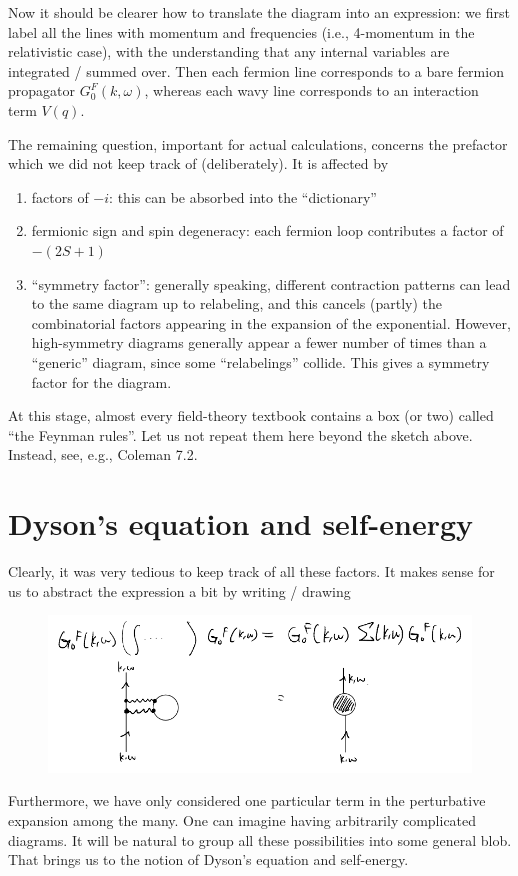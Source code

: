 Now it should be clearer how to translate the diagram into an expression: we first label all the lines with momentum and frequencies (i.e., 4-momentum in the relativistic case), with the understanding that any internal variables are integrated / summed over. Then each fermion line corresponds to a bare fermion propagator $G_0^F(k,\omega)$, whereas each wavy line corresponds to an interaction term $V(q)$.

The remaining question, important for actual calculations, concerns the prefactor which we did not keep track of (deliberately). It is affected by
\begin{enumerate}
    \item factors of $-i$: this can be absorbed into the ``dictionary''
    \item fermionic sign and spin degeneracy: each fermion loop contributes a factor of $-(2S+1)$
    \item ``symmetry factor'': generally speaking, different contraction patterns can lead to the same diagram up to relabeling, and this cancels (partly) the combinatorial factors appearing in the expansion of the exponential. However, high-symmetry diagrams generally appear a fewer number of times than a ``generic'' diagram, since some ``relabelings'' collide. This gives a symmetry factor for the diagram.
\end{enumerate}

At this stage, almost every field-theory textbook contains a box (or two) called ``the Feynman rules''. Let us not repeat them here beyond the sketch above. Instead, see, e.g., Coleman 7.2.

\section{Dyson's equation and self-energy}

Clearly, it was very tedious to keep track of all these factors. It makes sense for us to abstract the expression a bit by writing / drawing
\begin{figure}[H]
    \centering
    \includegraphics[width=\textwidth]{jupyterbook/data/fig/lec18-fig04.png}
\end{figure}
Furthermore, we have only considered one particular term in the perturbative expansion among the many. One can imagine having arbitrarily complicated diagrams. It will be natural to group all these possibilities into some general blob. That brings us to the notion of Dyson's equation and self-energy.


